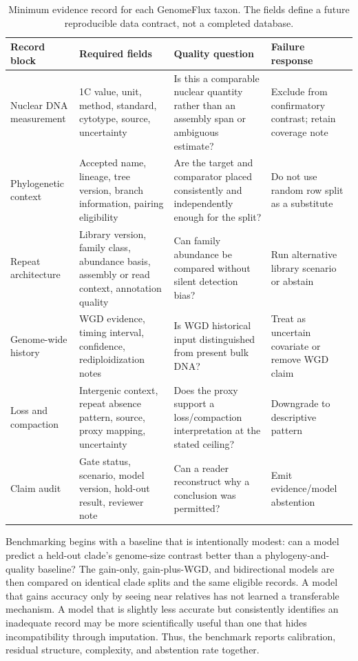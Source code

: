 \documentclass[conference]{IEEEtran}
\begin{document}
\begin{table}[t]
\caption{Minimum evidence record for each GenomeFlux taxon. The fields define a future reproducible data contract, not a completed database.}
\label{tab:record}
\centering
\footnotesize
\renewcommand{\arraystretch}{1.14}
\begin{tabular}{|p{}|p{}|p{}|p{}|}
\hline
\textbf{Record block} & \textbf{Required fields} & \textbf{Quality question} & \textbf{Failure response} \\
\hline
Nuclear DNA measurement & 1C value, unit, method, standard, cytotype, source, uncertainty & Is this a comparable nuclear quantity rather than an assembly span or ambiguous estimate? & Exclude from confirmatory contrast; retain coverage note \\
\hline
Phylogenetic context & Accepted name, lineage, tree version, branch information, pairing eligibility & Are the target and comparator placed consistently and independently enough for the split? & Do not use random row split as a substitute \\
\hline
Repeat architecture & Library version, family class, abundance basis, assembly or read context, annotation quality & Can family abundance be compared without silent detection bias? & Run alternative library scenario or abstain \\
\hline
Genome-wide history & WGD evidence, timing interval, confidence, rediploidization notes & Is WGD historical input distinguished from present bulk DNA? & Treat as uncertain covariate or remove WGD claim \\
\hline
Loss and compaction & Intergenic context, repeat absence pattern, source, proxy mapping, uncertainty & Does the proxy support a loss/compaction interpretation at the stated ceiling? & Downgrade to descriptive pattern \\
\hline
Claim audit & Gate status, scenario, model version, hold-out result, reviewer note & Can a reader reconstruct why a conclusion was permitted? & Emit evidence/model abstention \\
\hline
\end{tabular}
\end{table}

Benchmarking begins with a baseline that is intentionally modest: can a model predict a held-out clade's genome-size contrast better than a phylogeny-and-quality baseline? The gain-only, gain-plus-WGD, and bidirectional models are then compared on identical clade splits and the same eligible records. A model that gains accuracy only by seeing near relatives has not learned a transferable mechanism. A model that is slightly less accurate but consistently identifies an inadequate record may be more scientifically useful than one that hides incompatibility through imputation. Thus, the benchmark reports calibration, residual structure, complexity, and abstention rate together.
\end{document}
